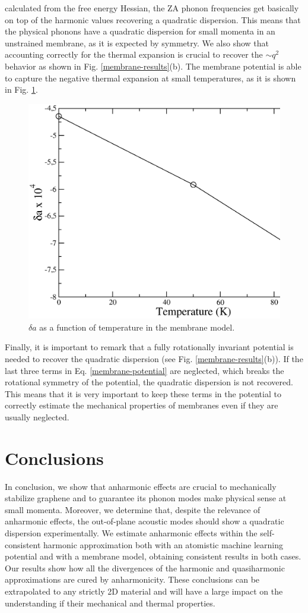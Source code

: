 calculated from the free energy Hessian, the ZA phonon frequencies get basically on top of the harmonic values 
recovering a quadratic dispersion. This means that the physical phonons have a quadratic dispersion for small momenta 
in an unstrained membrane, as it is expected by symmetry. We also show that accounting correctly for the thermal 
expansion is crucial to recover the $\sim q^2$ behavior as shown in Fig. \ref{membrane-results}(b). The membrane 
potential is able to capture the negative thermal expansion at small temperatures, as it is shown in 
Fig. \ref{cte-membrane}. 
\begin{figure}[ht]
\includegraphics[width=0.8\linewidth]{Figures/cte-membrane.eps}
\caption{$\delta a$ as a function of temperature in the membrane model.}
\label{cte-membrane}
\end{figure}
Finally, it is important to remark that a fully rotationally invariant potential is needed to recover the quadratic 
dispersion (see Fig. \ref{membrane-results}(b)). If the last three terms in Eq. \ref{membrane-potential} are 
neglected, which breaks the rotational symmetry of the potential, the quadratic dispersion is not recovered. This 
means that it is very important to keep these terms in the potential to correctly estimate the mechanical properties 
of membranes even if they are usually neglected\cite{mariani2008flexural,amorim2014thermodynamics,de2012bending}. 

\section{Conclusions}

In conclusion, we show that anharmonic effects are crucial to mechanically stabilize graphene and to guarantee its 
phonon modes make physical sense at small momenta. Moreover, we determine that, despite the relevance of anharmonic 
effects, the out-of-plane acoustic modes should show a quadratic dispersion experimentally. We estimate anharmonic 
effects within the self-consistent harmonic approximation both with an atomistic machine learning potential and with 
a membrane model, obtaining consistent results in both cases. Our results show how all the divergences of the 
harmonic and quasiharmonic approximations are cured by anharmonicity. These conclusions can be extrapolated to any 
strictly 2D material and will have a large impact on the understanding if their mechanical and thermal properties.
